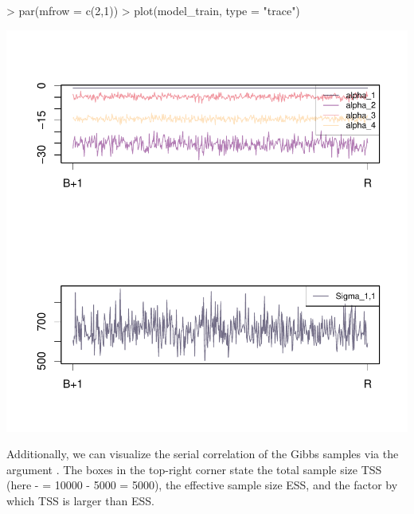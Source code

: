 \documentclass[article]{jss}
\begin{document}
\begin{Schunk}
\begin{Sinput}
> par(mfrow = c(2,1))
> plot(model_train, type = "trace")
\end{Sinput}
\end{Schunk}
\includegraphics{rprobitb_oelschlaeger_bauer-plot-trace-model-train}

Additionally, we can visualize the serial correlation of the Gibbs samples via the argument . The boxes in the top-right corner state the total sample size TSS (here  -  = 10000 - 5000 = 5000), the effective sample size ESS, and the factor by which TSS is larger than ESS.
\end{document}
